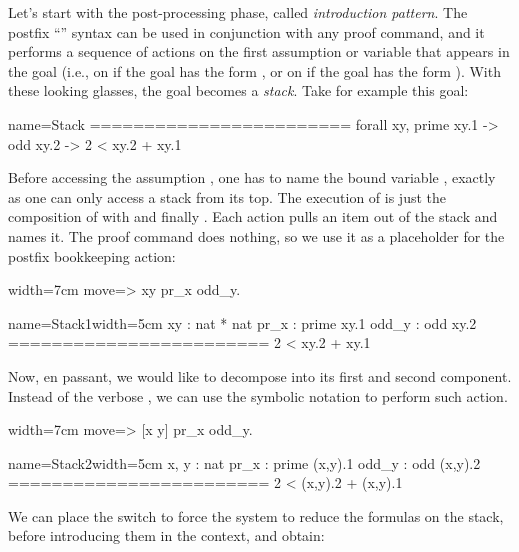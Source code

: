 Let's start with the post-processing phase, called \emph{introduction pattern}.
The postfix ``'' syntax can be used in conjunction with any proof
command, and it performs a sequence of actions on the first
assumption or variable that appears in the goal (i.e., on
 if the goal has the form , or on
 if the goal has the form ).
With these looking glasses, the goal becomes a
\emph{stack}. Take for example this goal:

\begin{coqout}{name=Stack}{}
========================
forall xy, prime xy.1 -> odd xy.2 -> 2 < xy.2 + xy.1
\end{coqout}

Before accessing the assumption , one has to name the
bound variable , exactly as one can only access a stack from its top.
The execution of  is just the composition of
 with  and finally .  Each action
pulls an item out of the stack and names it.  The  proof
command does nothing, so we use it as a placeholder
for the postfix \C{=>} bookkeeping action:

\begin{coq-left}{}{width=7cm}
move=> xy pr_x odd_y.
$~$
$~$
$~$
$~$
\end{coq-left}
\begin{coqout-right}{name=Stack1}{width=5cm}
 xy : nat * nat
 pr_x : prime xy.1
 odd_y : odd xy.2
========================
 2 < xy.2 + xy.1
\end{coqout-right}

Now, en passant, we would like to decompose  into its first
and second component.  Instead of the verbose ,
we can use the symbolic notation \C{[]} to perform such action.

\begin{coq-left}{}{width=7cm}
move=> [x y] pr_x odd_y.
$~$
$~$
$~$
$~$
\end{coq-left}
\begin{coqout-right}{name=Stack2}{width=5cm}
 x, y : nat
 pr_x : prime (x,y).1
 odd_y : odd (x,y).2
========================
 2 < (x,y).2 + (x,y).1
\end{coqout-right}

We can place the \C{/=} switch to force the system to reduce the formulas on
the stack, before introducing them in the context, and obtain:

